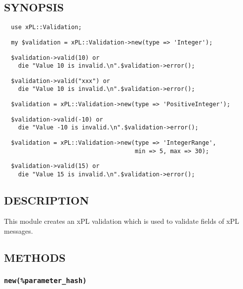 \subsection*{SYNOPSIS\label{xPL::Validation_SYNOPSIS}}
\begin{verbatim}
  use xPL::Validation;
\end{verbatim}
\begin{verbatim}
  my $validation = xPL::Validation->new(type => 'Integer');
\end{verbatim}
\begin{verbatim}
  $validation->valid(10) or
    die "Value 10 is invalid.\n".$validation->error();
\end{verbatim}
\begin{verbatim}
  $validation->valid("xxx") or
    die "Value 10 is invalid.\n".$validation->error();
\end{verbatim}
\begin{verbatim}
  $validation = xPL::Validation->new(type => 'PositiveInteger');
\end{verbatim}
\begin{verbatim}
  $validation->valid(-10) or
    die "Value -10 is invalid.\n".$validation->error();
\end{verbatim}
\begin{verbatim}
  $validation = xPL::Validation->new(type => 'IntegerRange',
                                     min => 5, max => 30);
\end{verbatim}
\begin{verbatim}
  $validation->valid(15) or
    die "Value 15 is invalid.\n".$validation->error();
\end{verbatim}
\subsection*{DESCRIPTION\label{xPL::Validation_DESCRIPTION}}


This module creates an xPL validation which is used to validate fields
of xPL messages.

\subsection*{METHODS\label{xPL::Validation_METHODS}}
\subsubsection*{\texttt{new(\%parameter\_hash)}\label{xPL::Validation_new_parameter_hash_}}


